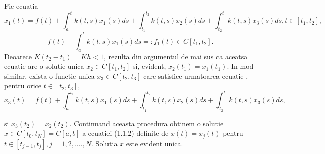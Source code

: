 \documentclass[a4paper,12pt,oneside]{report}
\begin{document}
Fie ecuatia 
\begin{displaymath}
	x_{1}\left ( t \right ) = f\left ( t \right ) + \int_{a}^{t}k\left ( t,s \right )x_{1}\left ( s \right )ds + \int_{t_{1}}^{t_{2}}k\left ( t,s \right )x_{2}\left ( s \right )ds + \int_{t_{2}}^{t}k\left ( t,s \right )x_{3}\left ( s \right )ds,  t\in \left [ t_{1}, t_{2} \right ], 
\end{displaymath}
\begin{displaymath}
	f\left ( t \right ) + \int_{a}^{t}k\left ( t,s \right )x_{1}\left ( s \right )ds =:f_{1}\left ( t \right ) \in C \left [ t_{1} , t_{2} \right ].
\end{displaymath}
Deoarece \(K\left ( t_{2} - t_{1} \right ) = Kh < 1\), rezulta din argumentul de mai sus ca aceatsa ecuatie are o solutie unica \(x_{2} \in C\left [ t_{1}, t_{2} \right ]\) si, evident, \(x_{2} \left ( t_{1} \right ) = x_{1} \left ( t_{1} \right )\). In mod similar, exista o functie unica \(x_{3} \in C\left [ t_{2} , t_{3} \right ]\) care satisfice urmatoarea ecuatie , pentru orice \(t\in \left [ t_{2} , t_{3} \right ],\)
\begin{displaymath}
	x_{3}\left ( t \right ) = f\left ( t \right ) + \int_{a}^{t_{1}}k\left ( t,s \right )x_{1}\left ( s \right )ds + \int_{t_{1}}^{t_{2}}k\left ( t,s \right )x_{2}\left ( s \right )ds + \int_{t_{2}}^{t}k\left ( t,s \right )x_{3}\left ( s \right )ds, 
\end{displaymath}

si \(x_{3}\left ( t_{2} \right ) = x_{2}\left ( t_{2} \right )\). Continuand aceasta procedura obtinem o solutie \(x\in C\left [ t_{0}, t_{N} \right ] = C\left [ a,b \right ]\) a ecuatiei (1.1.2) definite de \(x\left ( t \right ) = x_{j}\left ( t \right )\) pentru \(t\in \left [ t_{j-1}, t_{j} \right ], j = 1,2,....,N\). Solutia \(x\) este evident unica. 
\end{document}
